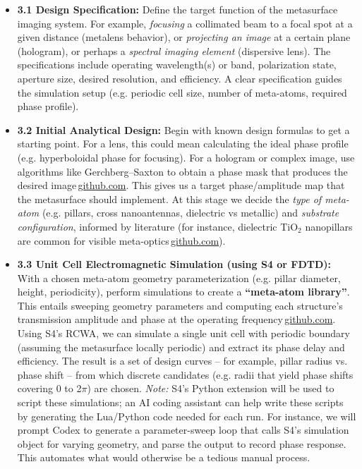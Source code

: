 \documentclass[11pt]{article}
\begin{document}
\begin{itemize}
  \item \textbf{3.1 Design Specification:} Define the target function of the metasurface imaging system. For example, \emph{focusing} a collimated beam to a focal spot at a given distance (metalens behavior), or \emph{projecting an image} at a certain plane (hologram), or perhaps a \emph{spectral imaging element} (dispersive lens). The specifications include operating wavelength(s) or band, polarization state, aperture size, desired resolution, and efficiency. A clear specification guides the simulation setup (e.g. periodic cell size, number of meta-atoms, required phase profile).
  \item \textbf{3.2 Initial Analytical Design:} Begin with known design formulas to get a starting point. For a lens, this could mean calculating the ideal phase profile (e.g. hyperboloidal phase for focusing). For a hologram or complex image, use algorithms like Gerchberg--Saxton to obtain a phase mask that produces the desired image\,\href{https://github.com/hzzg0727/Metasurface-Design#:~:text=Computer%20generated%20hologram}{github.com}. This gives us a target phase/amplitude map that the metasurface should implement. At this stage we decide the \emph{type of meta-atom} (e.g. pillars, cross nanoantennas, dielectric vs metallic) and \emph{substrate configuration}, informed by literature (for instance, dielectric TiO$_2$ nanopillars are common for visible meta-optics\,\href{https://github.com/hzzg0727/Metasurface-Design#:~:text=The%20TiO2%20data%20in%20the,INFO%20website}{github.com}).
  \item \textbf{3.3 Unit Cell Electromagnetic Simulation (using S4 or FDTD):} With a chosen meta-atom geometry parameterization (e.g. pillar diameter, height, periodicity), perform simulations to create a \textbf{``meta-atom library''}. This entails sweeping geometry parameters and computing each structure's transmission amplitude and phase at the operating frequency\,\href{https://github.com/hzzg0727/Metasurface-Design#:~:text=Propagation%20phase%20metasurface%20design}{github.com}. Using S4's RCWA, we can simulate a single unit cell with periodic boundary (assuming the metasurface locally periodic) and extract its phase delay and efficiency. The result is a set of design curves -- for example, pillar radius vs. phase shift -- from which discrete candidates (e.g. radii that yield phase shifts covering 0 to 2$\pi$) are chosen. \emph{Note:} S4's Python extension will be used to script these simulations; an AI coding assistant can help write these scripts by generating the Lua/Python code needed for each run. For instance, we will prompt Codex to generate a parameter-sweep loop that calls S4's simulation object for varying geometry, and parse the output to record phase response. This automates what would otherwise be a tedious manual process.

\end{itemize}
\end{document}
